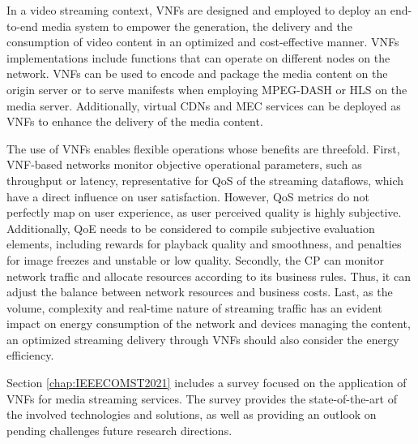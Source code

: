 In a video streaming context, VNFs are designed and employed to deploy an end-to-end media system to empower the generation, the delivery and the consumption of video content in an optimized and cost-effective manner. VNFs implementations include functions that can operate on different nodes on the network. VNFs can be used to encode and package the media content on the origin server or to serve manifests when employing MPEG-DASH or HLS on the media server. Additionally, virtual CDNs and MEC services can be deployed as VNFs to enhance the delivery of the media content.

The use of VNFs enables flexible operations whose benefits are threefold. First, VNF-based networks monitor objective operational parameters, such as throughput or latency, representative for QoS of the streaming dataflows, which have a direct influence on user satisfaction.
However, QoS metrics do not perfectly map on user experience, as user perceived quality is highly subjective. Additionally, QoE needs to be considered to compile subjective evaluation elements, including rewards for playback quality and smoothness, and penalties for image freezes and unstable or low quality.
Secondly, the CP can monitor network traffic and allocate resources according to its business rules. Thus, it can adjust the balance between network resources and business costs.
Last, as the volume, complexity and real-time nature of streaming traffic has an evident impact on energy consumption of the network and devices managing the content, an optimized streaming delivery through VNFs should also consider the energy efficiency.

Section \ref{chap:IEEECOMST2021} includes a survey focused on the application of VNFs for media streaming services. The survey provides the state-of-the-art of the involved technologies and solutions, as well as providing an outlook on pending challenges future research directions.